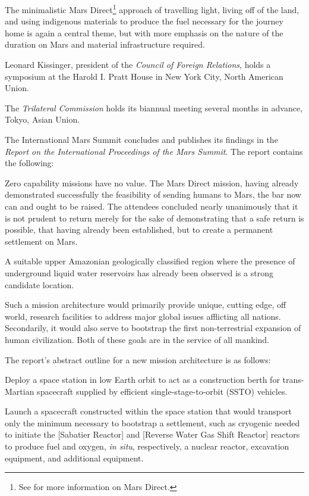 The minimalistic Mars Direct\footnote{See  for more information on Mars Direct.} approach of travelling light, living off of the land, and using indigenous materials to produce the fuel necessary for the journey home is again a central theme, but with more emphasis on the nature of the duration on Mars and material infrastructure required.
\StopTimelineDate

Leonard Kissinger, president of the {\it Council of Foreign Relations}, holds a symposium at the Harold I. Pratt House in New York City, North American Union.
\StopTimelineDate

The {\it Trilateral Commission} holds its biannual meeting several months in advance, Tokyo, Asian Union.
\StopTimelineDate

The International Mars Summit concludes and publishes its findings in the {\it Report on the International Proceedings of the Mars Summit}. The report contains the following:

\startTimelineDocument
Zero capability missions have no value. The Mars Direct mission, having already demonstrated successfully the feasibility of sending humans to Mars, the bar now can and ought to be raised. The attendees concluded nearly unanimously that it is not prudent to return merely for the sake of demonstrating that a safe return is possible, that having already been established, but to create a permanent settlement on Mars. 

A suitable upper Amazonian geologically classified region where the presence of underground liquid water reservoirs has already been observed is a strong candidate location. 

Such a mission architecture would primarily provide unique, cutting edge, off world, research facilities to address major global issues afflicting all nations. Secondarily, it would also serve to bootstrap the first non-terrestrial expansion of human civilization. Both of these goals are in the service of all mankind.
\stopTimelineDocument

The report's abstract outline for a new mission architecture is as follows:

\startitemize[n]
\item Deploy a space station in low Earth orbit to act as a construction berth for trans-Martian spacecraft supplied by efficient single-stage-to-orbit (SSTO) vehicles.

\item Launch a spacecraft constructed within the space station that would transport only the minimum necessary to bootstrap a settlement, such as cryogenic  needed to initiate the [Sabatier Reactor] and [Reverse Water Gas Shift Reactor] reactors to produce fuel and oxygen, {\it in situ}, respectively, a nuclear reactor, excavation equipment, and additional equipment.

